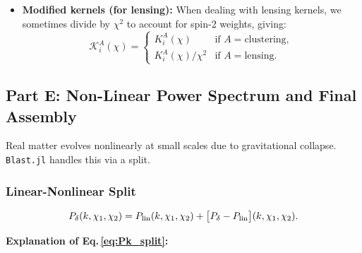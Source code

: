 \begin{itemize}[leftmargin=1.5cm]
    \item \textbf{Modified kernels (for lensing):} When dealing with lensing kernels, we sometimes divide by $\chi^2$ to account for spin-2 weights, giving:
    \begin{equation}
        \mathcal{K}^A_i(\chi) =
        \begin{cases}
            K^A_i(\chi)       & \text{if } A = \text{clustering},\\
            K^A_i(\chi)/\chi^2 & \text{if } A = \text{lensing}.
        \end{cases}
        \label{eq:kernel_mod}
    \end{equation}
\end{itemize}

\subsection{Part E: Non-Linear Power Spectrum and Final Assembly}

Real matter evolves nonlinearly at small scales due to gravitational collapse. \texttt{Blast.jl} handles this via a split.

\subsubsection{Linear-Nonlinear Split}

\begin{equation}
    P_\delta(k,\chi_1,\chi_2) = P_{\rm lin}(k,\chi_1,\chi_2)
    + \bigl[P_\delta - P_{\rm lin}\bigr](k,\chi_1,\chi_2).
    \label{eq:Pk_split}
\end{equation}

\noindent\textbf{\large Explanation of Eq.\,\eqref{eq:Pk_split}:}\\

